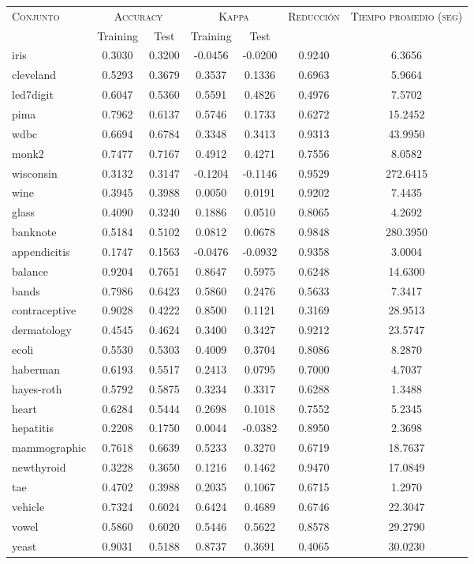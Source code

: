 \begin{table}[]
\centering
\begin{tabular}{l c c c c c c}
\hline
\multirow{2}{*}{\textsc{Conjunto}}
	& \multicolumn{2}{c}{\textsc{Accuracy}}
	& \multicolumn{2}{c}{\textsc{Kappa}}
	& \textsc{Reducción}
	& \textsc{Tiempo promedio (seg)} \\
	& Training & Test
	& Training & Test \\ 
\hline
\hline

iris & 0.3030 & 0.3200 & -0.0456 & -0.0200 & 0.9240 & 6.3656 \\
cleveland & 0.5293 & 0.3679 & 0.3537 & 0.1336 & 0.6963 & 5.9664 \\
led7digit & 0.6047 & 0.5360 & 0.5591 & 0.4826 & 0.4976 &  7.5702 \\
pima & 0.7962 & 0.6137 & 0.5746 & 0.1733 & 0.6272 &  15.2452 \\
wdbc & 0.6694 & 0.6784 & 0.3348 & 0.3413 & 0.9313 &  43.9950 \\
monk2 & 0.7477 & 0.7167 & 0.4912 & 0.4271 & 0.7556 &  8.0582 \\
wisconsin & 0.3132 & 0.3147 & -0.1204 & -0.1146 & 0.9529 & 272.6415 \\
wine & 0.3945 & 0.3988 & 0.0050 & 0.0191 & 0.9202 & 7.4435 \\
glass & 0.4090 & 0.3240 & 0.1886 & 0.0510 & 0.8065 & 4.2692 \\
banknote & 0.5184 & 0.5102 & 0.0812 & 0.0678 & 0.9848 & 280.3950 \\
appendicitis & 0.1747 & 0.1563 & -0.0476 & -0.0932 & 0.9358 & 3.0004 \\
balance & 0.9204 & 0.7651 & 0.8647 & 0.5975 & 0.6248 &  14.6300 \\
bands & 0.7986 & 0.6423 & 0.5860 & 0.2476 & 0.5633 & 7.3417 \\
contraceptive & 0.9028 & 0.4222 & 0.8500 & 0.1121 & 0.3169 &  28.9513 \\
dermatology & 0.4545 & 0.4624 & 0.3400 & 0.3427 & 0.9212 &  23.5747 \\
ecoli & 0.5530 & 0.5303 & 0.4009 & 0.3704 & 0.8086 &  8.2870 \\
haberman & 0.6193 & 0.5517 & 0.2413 & 0.0795 & 0.7000 & 4.7037 \\
hayes-roth & 0.5792 & 0.5875 & 0.3234 & 0.3317 & 0.6288 & 1.3488 \\
heart & 0.6284 & 0.5444 & 0.2698 & 0.1018 & 0.7552 & 5.2345 \\
hepatitis & 0.2208 & 0.1750 & 0.0044 & -0.0382 & 0.8950 & 2.3698 \\
mammographic & 0.7618 & 0.6639 & 0.5233 & 0.3270 & 0.6719 &  18.7637 \\
newthyroid & 0.3228 & 0.3650 & 0.1216 & 0.1462 & 0.9470 &  17.0849 \\
tae & 0.4702 & 0.3988 & 0.2035 & 0.1067 & 0.6715 & 1.2970 \\
vehicle & 0.7324 & 0.6024 & 0.6424 & 0.4689 & 0.6746 &  22.3047 \\
vowel & 0.5860 & 0.6020 & 0.5446 & 0.5622 & 0.8578 &  29.2790 \\
yeast & 0.9031 & 0.5188 & 0.8737 & 0.3691 & 0.4065 &  30.0230 \\


\end{tabular}
\end{table}
